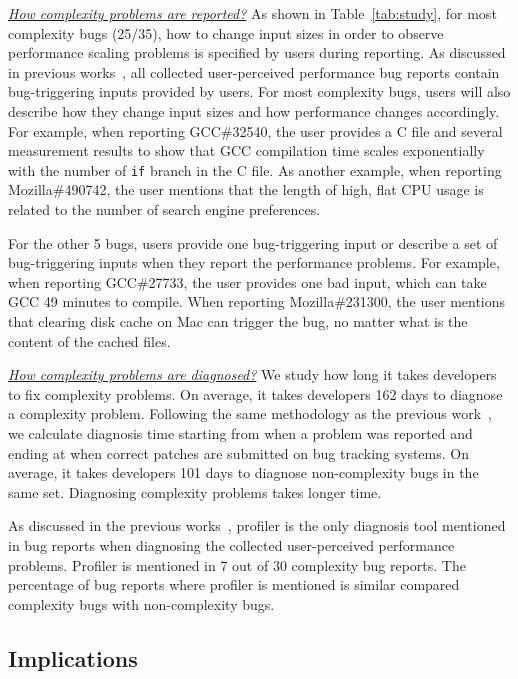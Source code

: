 {\underline{\textit{How complexity problems are reported?}}
As shown in Table~\ref{tab:study},
for most complexity bugs (25/35), 
how to change input sizes in order to observe performance scaling problems 
is specified by users during reporting. 
As discussed in previous works~\cite{SongOOPSLA2014}, 
all collected user-perceived performance bug reports
contain bug-triggering inputs provided by users. 
For most complexity bugs, 
users will also describe how they change input sizes 
and how performance changes accordingly. 
For example, when reporting GCC\#32540, 
the user provides a C file and several measurement results to 
show that GCC compilation time scales exponentially 
with the number of \texttt{if} branch in the C file. 
As another example, when reporting Mozilla\#490742, 
the user mentions that the length of high, 
flat CPU usage is related to the number of search engine preferences. 

For the other 5 bugs, users provide one bug-triggering input 
or describe a set of bug-triggering inputs when they report the performance problems. 
For example, when reporting GCC\#27733, 
the user provides one bad input, which can take GCC 49 minutes to compile. 
When reporting Mozilla\#231300, the user mentions that clearing disk cache on Mac can trigger the bug, 
no matter what is the content of the cached files. 

{\underline{\textit{How complexity problems are diagnosed?}}
We study how long it takes developers to fix complexity problems. 
On average, it takes developers 162 days to diagnose a complexity problem. 
Following the same methodology as the previous work~\cite{SongOOPSLA2014},
we calculate diagnosis time starting from when a problem was reported 
and ending at when correct patches are submitted on bug tracking systems. 
On average, it takes developers 101 days to diagnose non-complexity bugs in the same set. 
Diagnosing complexity problems takes longer time. 


As discussed in the previous works~\cite{SongOOPSLA2014}, 
profiler is the only diagnosis tool mentioned in bug reports 
when diagnosing the collected user-perceived performance problems. 
Profiler is mentioned in 7 out of 30 complexity bug reports. 
The percentage of bug reports where profiler is mentioned 
is similar compared complexity bugs with non-complexity bugs. 


\subsection{Implications}


}}
